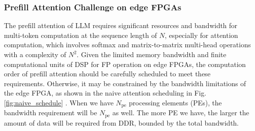 \documentclass[sigconf]{acmart}
\begin{document}
\subsubsection{Prefill Attention Challenge on edge FPGAs}
The prefill attention of LLM requires significant resources and bandwidth for multi-token computation at the sequence length of $N$, especially for attention computation, which involves softmax and matrix-to-matrix multi-head operations with a complexity of \( N^2 \). Given the limited memory bandwidth and finite computational units of DSP for FP operation on edge FPGAs, the computation order of prefill attention should be carefully scheduled to meet these requirements. Otherwise, it may be constrained by the bandwidth limitations of the edge FPGA, as shown in the naive attention scheduling in Fig. \ref{fig:naive_schedule} \cite{edgemoe}. When we have $N_{\text{pe}}$ processing elements (PEs), the bandwidth requirement will be $N_{\text{pe}}$ as well. The more PE we have, the larger the amount of data will be required from DDR, bounded by the total bandwidth. 
\end{document}
